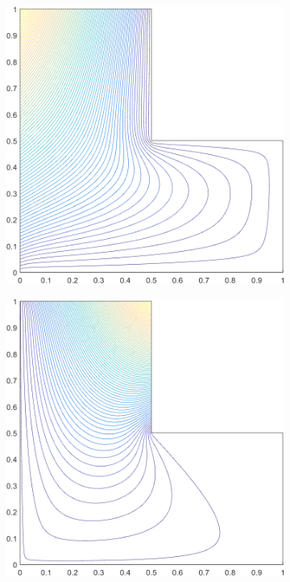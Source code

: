 \begin{figure}
\label{fig::2D_MV1_Ldom_basis_functions}
\centering
	\begin{subfigure}[b]{0.39\textwidth}
		\centering
		\includegraphics[width=\textwidth]{figures/sec_BF/L-domain_MV1_contour_b6.png}
		\caption{}
	\end{subfigure}
	\hspace{1.5cm}
	\begin{subfigure}[b]{0.39\textwidth}
		\centering
		\includegraphics[width=\textwidth]{figures/sec_BF/L-domain_MV1_contour_b5.png}

\end{subfigure}
\end{figure}
